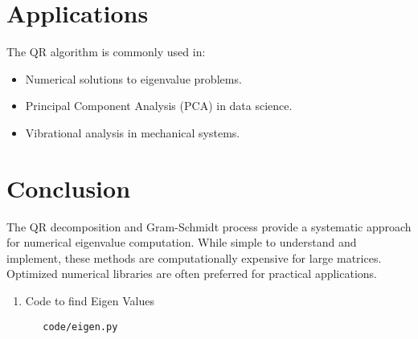 \documentclass[journal,12pt,onecolumn]{IEEEtran}
\theoremstyle{remark}
\begin{document}
\section{Applications}
The QR algorithm is commonly used in:
\begin{itemize}
    \item Numerical solutions to eigenvalue problems.
    \item Principal Component Analysis (PCA) in data science.
    \item Vibrational analysis in mechanical systems.
\end{itemize}

\section{Conclusion}
The QR decomposition and Gram-Schmidt process provide a systematic approach for numerical eigenvalue computation. While simple to understand and implement, these methods are computationally expensive for large matrices. Optimized numerical libraries are often preferred for practical applications.
\begin{enumerate}
\item Code to find Eigen Values  
\begin{lstlisting}
   code/eigen.py
\end{lstlisting}
\end{enumerate}
\end{document}
